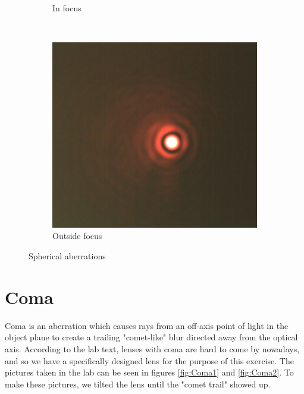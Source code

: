 \documentclass[a4paper,12pt]{article}
\begin{document}
\begin{figure}[H]
\begin{subfigure}{0.3\textwidth}
                \caption{In focus}
                \label{fig:sain}
        \end{subfigure}%
        ~ %
        \begin{subfigure}{0.3\textwidth}
                \includegraphics[width=\textwidth]{airyoutfocus}
                \caption{Outside focus}
                \label{fig:saout}
        \end{subfigure}
        \caption{Spherical aberrations}\label{fig:Spherical aberrations}
\end{figure}

\section{Coma}
Coma is an aberration which causes rays from an off-axis point of light in the object plane to create a trailing "comet-like" blur directed away from the optical axis. According to the lab text, lenses with coma are hard to come by nowadays, and so we have a specifically designed lens for the purpose of this exercise. The pictures taken in the lab can be seen in figures \ref{fig:Coma1} and \ref{fig:Coma2}. To make these pictures, we tilted the lens until the "comet trail" showed up.
\end{document}
